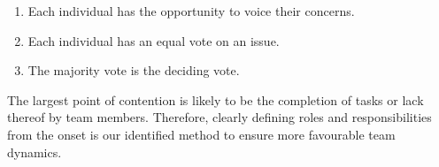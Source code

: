 \documentclass[11pt,a4paper]{article}
\begin{document}
\begin{enumerate}[itemsep=-1ex]
  \item Each individual has the opportunity to voice their concerns.
  \item Each individual has an equal vote on an issue.
  \item The majority vote is the deciding vote.
\end{enumerate}

The largest point of contention is likely to be the completion of tasks or lack thereof by team members.  Therefore, clearly defining roles and responsibilities from the onset is our identified method to ensure more favourable team dynamics.
\end{document}
